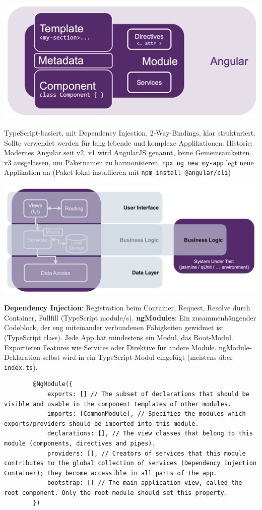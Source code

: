 \documentclass[10pt,landscape]{article}
\begin{document}
\begin{multicols}{3}
        \includegraphics[width=\linewidth]{base_angular}

        TypeScript-basiert, mit Dependency Injection, 2-Way-Bindings, klar strukturiert.
        Sollte verwendet werden für lang lebende und komplexe Applikationen.
        Historie: Modernes Angular seit v2, v1 wird AngularJS genannt, keine Gemeinsamkeiten.
        v3 ausgelassen, um Paketnamen zu harmonisieren.
        \lstinline{npx ng new my-app} legt neue Applikation an (Paket lokal installieren mit \lstinline{npm install @angular/cli})

        \includegraphics[width=\linewidth]{angular_logical_layers}

        \textbf{Dependency Injection}: Registration beim Container, Request, Resolve durch Container, Fullfill (TypeScript module/s).
        \textbf{ngModules}: Ein zusammenhängender Codeblock, der eng miteinander verbundenen Fähigkeiten gewidmet ist (TypeScript class).
        Jede App hat mindestens ein Modul, das Root-Modul.
        Exportieren Features wie Services oder Direktive für andere Module.
        ngModule-Deklaration selbst wird in ein TypeScript-Modul eingefügt (meistens über \lstinline{index.ts}).

        \begin{lstlisting}
        @NgModule({
            exports: [] // The subset of declarations that should be visible and usable in the component templates of other modules.
            imports: [CommonModule], // Specifies the modules which exports/providers should be imported into this module.
            declarations: [], // The view classes that belong to this module (components, directives and pipes).
            providers: [], // Creators of services that this module contributes to the global collection of services (Dependency Injection Container); they become accessible in all parts of the app.
            bootstrap: [] // The main application view, called the root component. Only the root module should set this property.
        })


\end{lstlisting}
\end{multicols}
\end{document}

